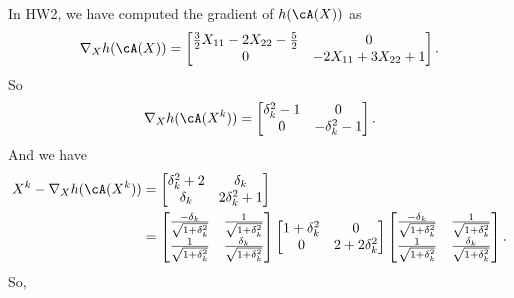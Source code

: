 In HW2,
we have computed the gradient of $h(\cA(X))$ as
\begin{equation}
    \nabla_X h(\cA(X)) =
    \begin{bmatrix}
        \frac{3}{2}X_{11}-2X_{22}-\frac{5}{2} & 0 \\
        0   & -2X_{11}+3X_{22}+1 \\
    \end{bmatrix}.
\end{equation}
So
\begin{equation}
    \nabla_X h(\cA(X^k)) =
    \begin{bmatrix}
        \delta_k^2-1 & 0 \\
        0   & -\delta_k^2-1 \\
    \end{bmatrix}.
\end{equation}
And we have
\begin{equation}
\begin{split}
    X^k-\nabla_X h(\cA(X^k))
    &=\begin{bmatrix}
        \delta_k^2+2 & \delta_k \\
        \delta_k    & 2\delta_k^2+1 \\
    \end{bmatrix} \\
    &= \begin{bmatrix}
        \frac{-\delta_k}{\sqrt{1+\delta_k^2}} & \frac{1}{\sqrt{1+\delta_k^2}} \\
        \frac{1}{\sqrt{1+\delta_k^2}}  & \frac{\delta_k}{\sqrt{1+\delta_k^2}} \\
    \end{bmatrix}
    \begin{bmatrix}
        1+\delta_k^2 & 0 \\
        0  & 2+2\delta_k^2 \\
    \end{bmatrix}
    \begin{bmatrix}
        \frac{-\delta_k}{\sqrt{1+\delta_k^2}} & \frac{1}{\sqrt{1+\delta_k^2}} \\
        \frac{1}{\sqrt{1+\delta_k^2}}  & \frac{\delta_k}{\sqrt{1+\delta_k^2}} \\
    \end{bmatrix}. \\
\end{split}
\end{equation}
So,
